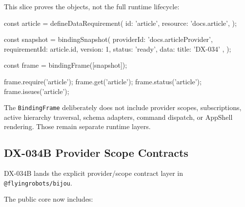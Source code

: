 This slice proves the objects, not the full runtime lifecycle:

\begin{CodeBlock}
const article = defineDataRequirement({
  id: 'article',
  resource: 'docs.article',
});

const snapshot = bindingSnapshot({
  providerId: 'docs.articleProvider',
  requirementId: article.id,
  version: 1,
  status: 'ready',
  data: { title: 'DX-034' },
});

const frame = bindingFrame([snapshot]);

frame.require('article');
frame.get('article');
frame.status('article');
frame.issues('article');
\end{CodeBlock}

The \texttt{B\allowbreak{}i\allowbreak{}n\allowbreak{}d\allowbreak{}i\allowbreak{}n\allowbreak{}g\allowbreak{}F\allowbreak{}r\allowbreak{}a\allowbreak{}m\allowbreak{}e} deliberately does not include provider scopes, subscriptions, active hierarchy traversal, schema adapters, command dispatch, or AppShell rendering. Those remain separate runtime layers.

\subsection{DX-034B Provider Scope Contracts}\label{record-132-dx-034b-provider-scope-contracts}

DX-034B lands the explicit provider/scope contract layer in \texttt{@\allowbreak{}f\allowbreak{}l\allowbreak{}y\allowbreak{}i\allowbreak{}n\allowbreak{}g\allowbreak{}r\allowbreak{}o\allowbreak{}b\allowbreak{}o\allowbreak{}t\allowbreak{}s\allowbreak{}/\allowbreak{}b\allowbreak{}i\allowbreak{}j\allowbreak{}o\allowbreak{}u}.

The public core now includes:


